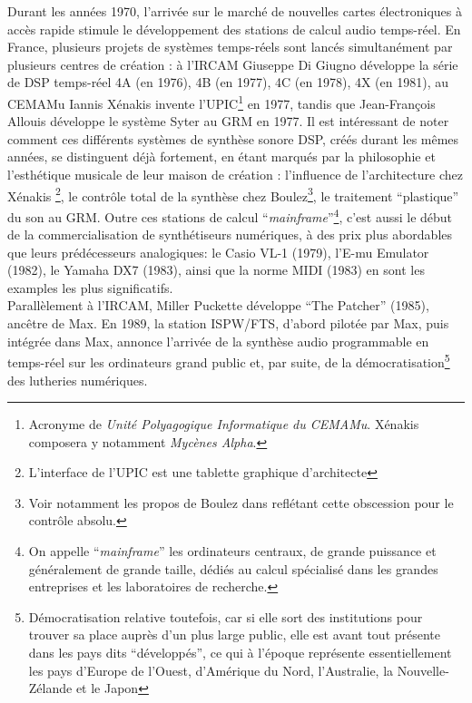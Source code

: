 \indent Durant les années 1970, l'arrivée sur le marché de nouvelles cartes électroniques à accès rapide stimule le développement des stations de calcul audio temps-réel. En France, plusieurs projets de systèmes temps-réels sont lancés simultanément par plusieurs centres de création : à l'\gls{IRCAM} Giuseppe Di Giugno développe la série de \gls{DSP} temps-réel 4A (en 1976), 4B (en 1977), 4C (en 1978), 4X (en 1981), au \gls{CEMAMu} Iannis Xénakis invente l'UPIC\footnote{Acronyme de \textit{Unité Polyagogique Informatique du \gls{CEMAMu}}. Xénakis composera y notamment \textit{Mycènes Alpha}.} en 1977, tandis que Jean-François Allouis développe le système Syter\cite{teruggi_technology_2007} au \gls{GRM} en 1977. Il est intéressant de noter comment ces différents systèmes de synthèse sonore \gls{DSP}, créés durant les mêmes années, se distinguent déjà fortement, en étant marqués par la philosophie et l'esthétique musicale de leur maison de création : l'influence de l'architecture chez Xénakis \footnote{L'interface de l'UPIC est une tablette graphique d'architecte}, le contrôle total de la synthèse chez Boulez\footnote{Voir notamment les propos de Boulez dans \cite{albera_pli_2017} reflétant cette obscession pour le contrôle absolu.}, le traitement ``plastique'' du son au \gls{GRM}. Outre ces stations de calcul ``\textit{mainframe}''\footnote{On appelle ``\textit{mainframe}'' les ordinateurs centraux, de grande puissance et généralement de grande taille, dédiés au calcul spécialisé dans les grandes entreprises et les laboratoires de recherche.}, c'est aussi le début de la commercialisation de synthétiseurs numériques, à des prix plus abordables que leurs prédécesseurs analogiques: le Casio VL-1 (1979), l'E-mu Emulator (1982), le Yamaha DX7 (1983), ainsi que la norme \gls{MIDI} (1983) en sont les examples les plus significatifs.\\
\indent Parallèlement à l'\gls{IRCAM}, Miller Puckette développe ``The Patcher'' (1985), ancêtre de Max. En 1989, la station \gls{ISPW}/\gls{FTS}, d'abord pilotée par Max, puis intégrée dans Max, annonce l'arrivée de la synthèse audio programmable en temps-réel sur les ordinateurs grand public et, par suite, de la démocratisation\footnote{Démocratisation relative toutefois, car si elle sort des institutions pour trouver sa place auprès d'un plus large public, elle est avant tout présente dans les pays dits ``développés'', ce qui à l'époque représente essentiellement les pays d'Europe de l'Ouest, d'Amérique du Nord, l'Australie, la Nouvelle-Zélande et le Japon} des lutheries numériques.


